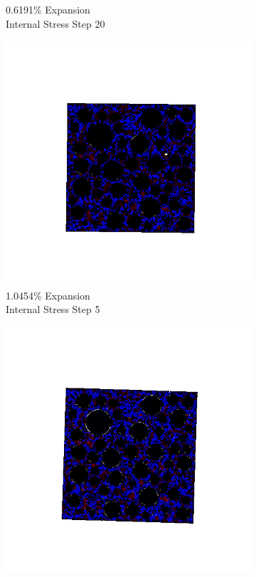 \begin{figure}[ht!]
\begin{subfigure}{.25\textwidth}
      \caption{0.6191\% Expansion\\Internal Stress Step 20}
    \end{subfigure}

    \begin{subfigure}{.25\textwidth}
      \centering
      \includegraphics[width=1.0\linewidth]{Files/exp_3D/DEF/A30X-1C_4_s5.png}
      \caption{1.0454\% Expansion\\Internal Stress Step 5}
    \end{subfigure}%
    \begin{subfigure}{.25\textwidth}
      \centering
      \includegraphics[width=1.0\linewidth]{Files/exp_3D/DEF/A30X-1C_4_s10.png}

\end{subfigure}
\end{figure}
